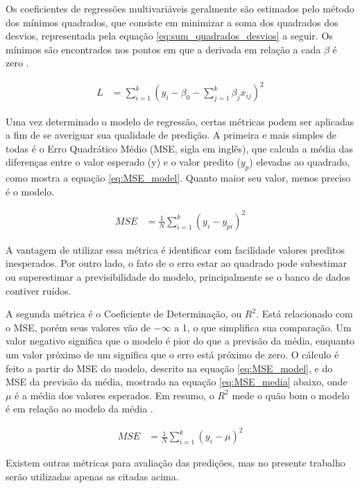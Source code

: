 \documentclass[brazil,tf,epusp]{usp}  %
\begin{document}
Os coeficientes de regressões multivariáveis geralmente são estimados pelo método dos mínimos quadrados, que consiste em minimizar a soma dos quadrados dos desvios, representada pela equação \ref{eq:sum_quadrados_desvios} a seguir. Os mínimos são encontrados nos pontos em que a derivada em relação a cada $\beta$ é zero \cite{Montgomery2013}.

\begin{align}
  L &=  \sum_{i=1}^k(y_i - \beta_0 - \sum_{j=1}^k  \beta_j x_{ij})^2
  \label{eq:sum_quadrados_desvios}
\end{align}

Uma vez determinado o modelo de regressão, certas métricas podem ser aplicadas a fim de se averiguar sua qualidade de predição. A primeira e mais simples de todas é o Erro Quadrático Médio (MSE, sigla em inglês), que calcula a média das diferenças entre o valor esperado (y) e o valor predito ($y_p$) elevadas ao quadrado, como mostra a equação \ref{eq:MSE_model}. Quanto maior seu valor, menos preciso é o modelo.

\begin{align}
  MSE &= \frac{1}{N} \sum_{i=1}^k(y_i - y_{pi})^2
  \label{eq:MSE_model}
\end{align}

A vantagem de utilizar essa métrica é identificar com facilidade valores preditos inesperados. Por outro lado, o fato de o erro estar ao quadrado pode subestimar ou superestimar a previsibilidade do modelo, principalmente se o banco de dados contiver ruídos.

A segunda métrica é o Coeficiente de Determinação, ou $R^{2}$. Está relacionado com o MSE, porém seus valores vão de $-\infty$ a 1, o que simplifica sua comparação. Um valor negativo significa que o modelo é pior do que a previsão da média, enquanto um valor próximo de um significa que o erro está próximo de zero. O cálculo é feito a partir do MSE do modelo, descrito na equação \ref{eq:MSE_model}, e do MSE da previsão da média, mostrado na equação \ref{eq:MSE_media} abaixo, onde $\mu$ é a média dos valores esperados. Em resumo, o $R^{2}$ mede o quão bom o modelo é em relação ao modelo da média \cite{Drakos2018}.

\begin{align}
  MSE &= \frac{1}{N} \sum_{i=1}^k(y_i - \mu)^2
  \label{eq:MSE_media}
\end{align}

Existem outras métricas para avaliação das predições, mas no presente trabalho serão utilizadas apenas as citadas acima.
\end{document}
